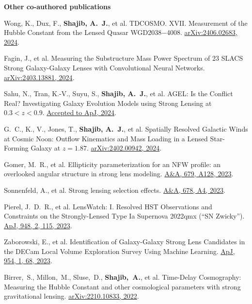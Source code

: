 \documentclass[margin, line]{res}
\begin{document}
\begin{resume}
\textbf{Other co-authored publications}
\begin{etaremune}
	\item Wong, K., Dux, F., \textbf{Shajib, A.~J.}, et al. TDCOSMO. XVII. Measurement of the Hubble Constant from the Lensed Quasar WGD2038$-$4008. \href{https://ui.adsabs.harvard.edu/abs/2024arXiv240602683W/abstract}{arXiv:2406.02683, 2024}.
	\item Fagin, J., et al. Measuring the Substructure Mass Power Spectrum of 23 SLACS Strong Galaxy-Galaxy Lenses with Convolutional Neural Networks. \href{https://ui.adsabs.harvard.edu/abs/2024arXiv240313881F/abstract}{arXiv:2403.13881, 2024}.
	\item Sahu, N., Tran, K.-V., Suyu, S., \textbf{Shajib, A.~J.}, et al. AGEL: Is the Conflict Real? Investigating Galaxy Evolution Models using Strong Lensing at $0.3 < z < 0.9$. \href{https://ui.adsabs.harvard.edu/abs/2024arXiv240515427S/abstract}{Accepted to ApJ, 2024}.
	\item G.~C., K., V., Jones, T., \textbf{Shajib, A.~J.}, et al. Spatially Resolved Galactic Winds at Cosmic Noon: Outflow Kinematics and Mass Loading in a Lensed Star-Forming Galaxy at $z=1.87$. \href{https://arxiv.org/abs/2402.00942}{arXiv:2402.00942, 2024}.
	\item Gomer, M.~R., et al. Ellipticity parameterization for an NFW profile: an overlooked angular structure in strong lens modeling. \href{https://ui.adsabs.harvard.edu/abs/2023A\%26A...679A.128G/abstract}{A\&A, 679, A128, 2023}.
	\item Sonnenfeld, A., et al. Strong lensing selection effects. \href{https://ui.adsabs.harvard.edu/abs/2023A\%26A...678A...4S/abstract}{A\&A, 678, A4, 2023}.
	\item Pierel, J.~D.~R., et al. LensWatch: I. Resolved HST Observations and Constraints on the Strongly-Lensed Type Ia Supernova 2022qmx (``SN Zwicky'').  \href{https://ui.adsabs.harvard.edu/abs/2023ApJ...948..115P/abstract}{ApJ, 948, 2, 115, 2023}.
	\item Zaborowski, E., et al. Identification of Galaxy-Galaxy Strong Lens Candidates in the DECam Local Volume Exploration Survey Using Machine Learning. \href{https://ui.adsabs.harvard.edu/abs/2023ApJ...954...68Z/abstract}{ApJ, 954, 1, 68, 2023}.
	\item Birrer,~S., Millon,~M., Sluse,~D., \textbf{Shajib,~A.}, et al. Time-Delay Cosmography: Measuring the Hubble Constant and other cosmological parameters with strong gravitational lensing. \href{https://arxiv.org/abs/2210.10833}{arXiv:2210.10833, 2022}.

\end{etaremune}
\end{resume}
\end{document}
